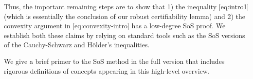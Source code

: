 Thus, the important remaining steps are to show that 1) the inequality \eqref{eq:intro1} (which is essentially the conclusion of our robust certifiability lemma) and 2) the convexity argument in \eqref{eq:convexity-intro} has a low-degree SoS proof. We establish both these claims by relying on standard tools such as the SoS versions of the Cauchy-Schwarz and H\"older's inequalities. %

We give a brief primer to the SoS method in the full version that includes rigorous definitions of concepts appearing in this high-level overview.

